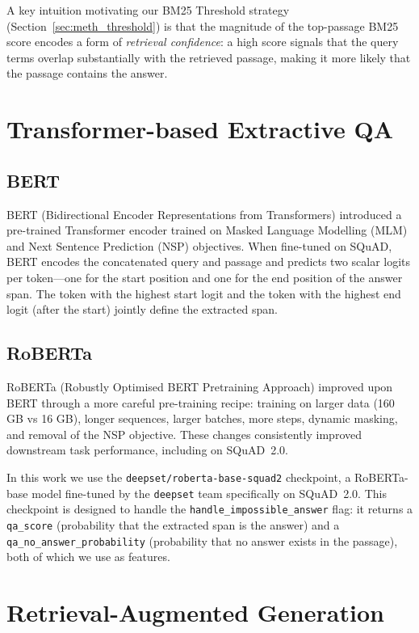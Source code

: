 A key intuition motivating our BM25 Threshold strategy (Section~\ref{sec:meth_threshold})
is that the magnitude of the top-passage BM25 score encodes a form of
\emph{retrieval confidence}: a high score signals that the query terms overlap
substantially with the retrieved passage, making it more likely that the
passage contains the answer.

\section{Transformer-based Extractive QA}
\label{sec:bg_transformer_qa}

\subsection{BERT}

BERT (Bidirectional Encoder Representations from Transformers)
\cite{devlin2019bert} introduced a pre-trained Transformer encoder trained on
Masked Language Modelling (MLM) and Next Sentence Prediction (NSP) objectives.
When fine-tuned on SQuAD, BERT encodes the concatenated query and passage and
predicts two scalar logits per token—one for the start position and one for the
end position of the answer span. The token with the highest start logit and the
token with the highest end logit (after the start) jointly define the extracted
span.

\subsection{RoBERTa}

RoBERTa (Robustly Optimised BERT Pretraining Approach) \cite{liu2019roberta}
improved upon BERT through a more careful pre-training recipe: training on
larger data (160 GB vs 16 GB), longer sequences, larger batches, more steps,
dynamic masking, and removal of the NSP objective. These changes consistently
improved downstream task performance, including on SQuAD~2.0.

In this work we use the \texttt{deepset/roberta-base-squad2} checkpoint, a
RoBERTa-base model fine-tuned by the \texttt{deepset} team specifically on
SQuAD~2.0. This checkpoint is designed to handle the \texttt{handle\_impossible\_answer}
flag: it returns a \texttt{qa\_score} (probability that the extracted span is
the answer) and a \texttt{qa\_no\_answer\_probability} (probability that no
answer exists in the passage), both of which we use as features.

\section{Retrieval-Augmented Generation}
\label{sec:bg_rag}

